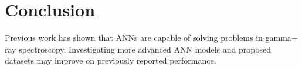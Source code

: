 \documentclass[tocnosub,noragright,centerchapter,12pt,fullpage]{uiucecethesis09}
\begin{document}
\chapter{Conclusion}

Previous work has shown that ANNs are capable of solving problems in gamma$-$ray spectroscopy. Investigating more advanced ANN models and proposed datasets may improve on previously reported performance.








\end{document}
